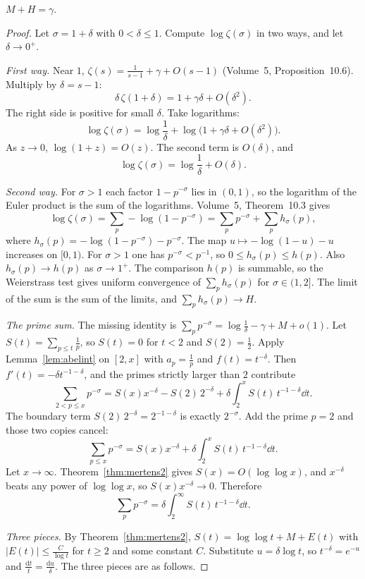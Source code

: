 \begin{lemma}\label{lem:mplush}
$M+H=\gamma$.
\end{lemma}
\begin{proof}
Let $\sigma=1+\delta$ with $0<\delta\le 1$. Compute $\log\zeta(\sigma)$ in two ways, and let $\delta\to 0^+$.

\emph{First way.} Near $1$, $\zeta(s)=\frac1{s-1}+\gamma+O(s-1)$ (Volume~5, Proposition~10.6). Multiply by $\delta=s-1$:
\[
\delta\,\zeta(1+\delta)=1+\gamma\delta+O(\delta^2).
\]
The right side is positive for small $\delta$. Take logarithms:
\[
\log\zeta(\sigma)=\log\frac1\delta+\log\bigl(1+\gamma\delta+O(\delta^2)\bigr).
\]
As $z\to 0$, $\log(1+z)=O(z)$. The second term is $O(\delta)$, and
\[
\log\zeta(\sigma)=\log\frac1\delta+O(\delta).
\]

\emph{Second way.} For $\sigma>1$ each factor $1-p^{-\sigma}$ lies in $(0,1)$, so the logarithm of the Euler product is the sum of the logarithms. Volume~5, Theorem~10.3 gives
\[
\log\zeta(\sigma)=\sum_p-\log(1-p^{-\sigma})=\sum_pp^{-\sigma}+\sum_ph_\sigma(p),
\]
where $h_\sigma(p)=-\log(1-p^{-\sigma})-p^{-\sigma}$. The map $u\mapsto-\log(1-u)-u$ increases on $[0,1)$. For $\sigma>1$ one has $p^{-\sigma}<p^{-1}$, so $0\le h_\sigma(p)\le h(p)$. Also $h_\sigma(p)\to h(p)$ as $\sigma\to 1^+$. The comparison $h(p)$ is summable, so the Weierstrass test gives uniform convergence of $\sum_ph_\sigma(p)$ for $\sigma\in(1,2]$. The limit of the sum is the sum of the limits, and $\sum_ph_\sigma(p)\to H$.

\emph{The prime sum.} The missing identity is $\sum_pp^{-\sigma}=\log\frac1\delta-\gamma+M+o(1)$. Let $S(t)=\sum_{p\le t}\frac1p$, so $S(t)=0$ for $t<2$ and $S(2)=\frac12$. Apply Lemma~\ref{lem:abelint} on $[2,x]$ with $a_p=\frac1p$ and $f(t)=t^{-\delta}$. Then $f'(t)=-\delta t^{-1-\delta}$, and the primes strictly larger than $2$ contribute
\[
\sum_{2<p\le x}p^{-\sigma}=S(x)x^{-\delta}-S(2)\,2^{-\delta}+\delta\int_2^x S(t)\,t^{-1-\delta}\dd t.
\]
The boundary term $S(2)\,2^{-\delta}=2^{-1-\delta}$ is exactly $2^{-\sigma}$. Add the prime $p=2$ and those two copies cancel:
\[
\sum_{p\le x}p^{-\sigma}=S(x)x^{-\delta}+\delta\int_2^x S(t)\,t^{-1-\delta}\dd t.
\]
Let $x\to\infty$. Theorem~\ref{thm:mertens2} gives $S(x)=O(\log\log x)$, and $x^{-\delta}$ beats any power of $\log\log x$, so $S(x)x^{-\delta}\to 0$. Therefore
\[
\sum_pp^{-\sigma}=\delta\int_2^\infty S(t)\,t^{-1-\delta}\dd t.
\]

\emph{Three pieces.} By Theorem~\ref{thm:mertens2}, $S(t)=\log\log t+M+E(t)$ with $|E(t)|\le\frac C{\log t}$ for $t\ge 2$ and some constant $C$. Substitute $u=\delta\log t$, so $t^{-\delta}=e^{-u}$ and $\frac{\mathrm dt}t=\frac{\mathrm du}\delta$. The three pieces are as follows.


\end{proof}
